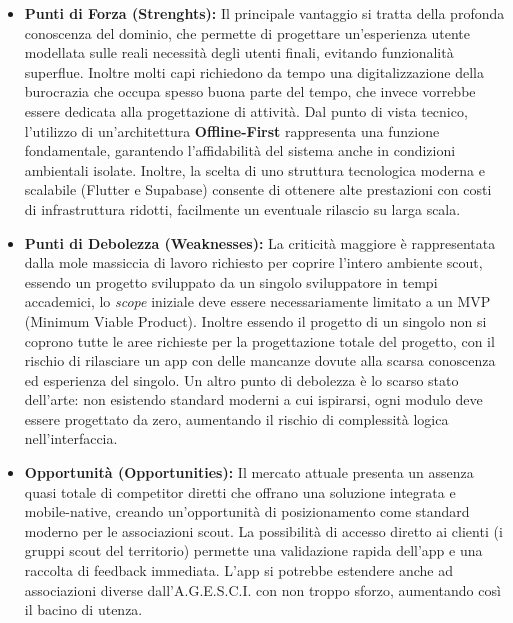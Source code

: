 \documentclass[11pt]{article}
\begin{document}
\begin{itemize}[topsep=0.5 pt]
  \item \textbf{Punti di Forza (Strenghts):} 
  Il principale vantaggio si tratta della profonda conoscenza del dominio, che permette di progettare un'esperienza utente modellata sulle reali necessità degli utenti finali, evitando funzionalità superflue. Inoltre molti capi richiedono da tempo una digitalizzazione della burocrazia che occupa spesso buona parte del tempo, che invece vorrebbe essere dedicata alla progettazione di attività. Dal punto di vista tecnico, l'utilizzo di un'architettura \textbf{Offline-First} rappresenta una funzione fondamentale, garantendo l'affidabilità del sistema anche in condizioni ambientali isolate. Inoltre, la scelta di uno struttura tecnologica moderna e scalabile (Flutter e Supabase) consente di ottenere alte prestazioni con costi di infrastruttura ridotti, facilmente un eventuale rilascio su larga scala.

  \item \textbf{Punti di Debolezza (Weaknesses):}
  La criticità maggiore è rappresentata dalla mole massiccia di lavoro richiesto per coprire l'intero ambiente scout, essendo un progetto sviluppato da un singolo  sviluppatore in tempi accademici, lo \textit{scope} iniziale deve essere necessariamente limitato a un MVP (Minimum Viable Product). Inoltre essendo il progetto di un singolo non si coprono tutte le aree richieste per la progettazione totale del progetto, con il rischio di rilasciare un app con delle mancanze dovute alla scarsa conoscenza ed esperienza del singolo. Un altro punto di debolezza è lo scarso stato dell'arte: non esistendo standard moderni a cui ispirarsi, ogni modulo deve essere progettato da zero, aumentando il rischio di complessità logica nell'interfaccia. 

  \item \textbf{Opportunità (Opportunities):}
  Il mercato attuale presenta un assenza quasi totale di competitor diretti che offrano una soluzione integrata e mobile-native, creando un'opportunità di posizionamento come standard moderno per le associazioni scout. La possibilità di accesso diretto ai clienti (i gruppi scout del territorio) permette una validazione rapida dell'app e una raccolta di feedback immediata. L'app si potrebbe estendere anche ad associazioni diverse dall'A.G.E.S.C.I. con non troppo sforzo, aumentando così il bacino di utenza.


\end{itemize}
\end{document}
